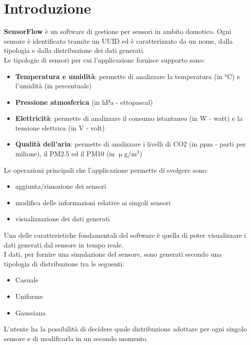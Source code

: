 \documentclass[a4paper, 10pt]{article}
\begin{document}
    \section{Introduzione}
    \textbf{SensorFlow} è un software di gestione per sensori in ambito domotico. Ogni sensore è identificato tramite un UUID ed è caratterizzato da un nome, dalla tipologia e dalla distribuzione dei dati generati.\\
    Le tipologie di sensori per cui l'applicazione fornisce supporto sono:
    \begin{itemize}
        \item \textbf{Temperatura e umidità}: permette di analizzare la temperatura (in °C) e l'umidità (in percentuale)
        \item \textbf{Pressione atmosferica} (in hPa - ettopascal) 
        \item \textbf{Elettricità}: permette di analizzare il consumo istantaneo (in W - watt) e la tensione elettrica (in V - volt)
        \item \textbf{Qualità dell'aria}: permette di analizzare i livelli di CO2 (in ppm - parti per milione), il PM2.5 ed il PM10 (in $\upmu$g/m$^3$)
    \end{itemize}
    Le operazioni principali che l'applicazione permette di svolgere sono:
    \begin{itemize}
        \item aggiunta/rimozione dei sensori
        \item modifica delle informazioni relative ai singoli sensori
        \item visualizzazione dei dati generati
    \end{itemize}
    Una delle caratteristiche fondamentali del software è quella di poter visualizzare i dati generati dal sensore in tempo reale.\\
    I dati, per fornire una simulazione del sensore, sono generati secondo una tipologia di distribuzione tra le seguenti:
    \begin{itemize}
        \item Casuale
        \item Uniforme
        \item Gaussiana
    \end{itemize}
    L'utente ha la possibilità di decidere quale distribuzione adottare per ogni singolo sensore e di modificarla in un secondo momento.
\end{document}
